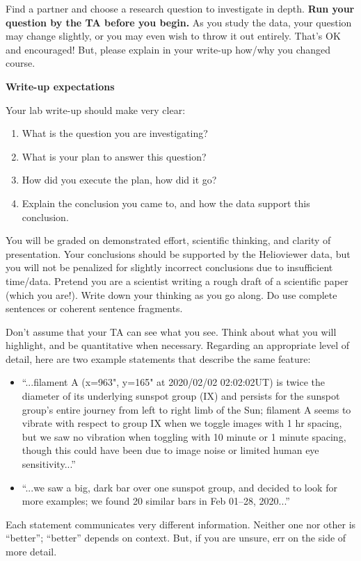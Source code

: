 \documentclass[11pt]{article}%
\newcommand{\SPACE}{\vspace{3em}}
\begin{document}
Find a partner and choose a research question to investigate in depth. \textbf{Run your question by the TA before you begin.} As you study the data, your question may change slightly, or you may even wish to throw it out entirely.  That's OK and encouraged!  But, please explain in your write-up how/why you changed course.

\textbf{Write-up expectations}

Your lab write-up should make very clear:
\begin{enumerate}
\item What is the question you are investigating?\SPACE
\item What is your plan to answer this question?\SPACE
\item How did you execute the plan, how did it go?\SPACE
\item Explain the conclusion you came to, and how the data support this conclusion.\SPACE
\end{enumerate}

You will be graded on demonstrated effort, scientific thinking, and clarity of
presentation.
Your conclusions should be supported by the Helioviewer data, but you will not
be penalized for slightly incorrect conclusions due to insufficient time/data.
Pretend you are a scientist writing a rough draft of a scientific paper
(which you are!).
Write down your thinking as you go along.
Do use complete sentences or coherent sentence fragments.

Don't assume that your TA can see what you see.
Think about what you will highlight, and be quantitative when necessary.
Regarding an appropriate level of detail, here are two example statements that
describe the same feature:
\begin{itemize}
\item ``...filament A (x=963", y=165" at 2020/02/02 02:02:02UT) is twice the
    diameter of its underlying sunspot group (IX) and persists for the sunspot
    group's entire journey from left to right limb of the Sun; filament A
    seems to vibrate with respect to group IX when we toggle images with 1 hr
    spacing, but we saw no vibration when toggling with 10 minute or 1 minute
    spacing, though this could have been due to image noise or limited human
    eye sensitivity...''
\item ``...we saw a big, dark bar over one sunspot group, and decided to look for more examples; we found 20 similar bars in Feb 01--28, 2020...''
\end{itemize}
Each statement communicates very different information. Neither one nor other is ``better''; ``better'' depends on context.  But, if you are unsure, err on the side of more detail.
\end{document}
